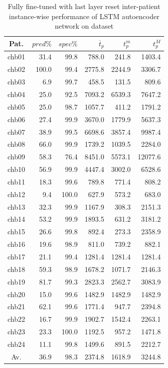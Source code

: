 \begin{table}[ht]
    \centering
    \begin{tabular}{c|rrrrr}
    Pat.  & $pred\%$ & $spec\%$ & $\overline{t}_p$   & $t_p^m$  & $t_p^M$   \\ \hline
    chb01   & 31.4   & 99.8   & 788.0   & 241.8   & 1403.4  \\
    chb02   & 100.0  & 99.4   & 2775.8  & 2244.9  & 3306.7  \\
    chb03   & 6.9    & 99.7   & 458.5   & 131.5   & 809.6   \\
    chb04   & 25.0   & 92.5   & 7093.2  & 6539.3  & 7647.2  \\
    chb05   & 25.0   & 98.7   & 1057.7  & 411.2   & 1791.2  \\
    chb06   & 27.4   & 99.9   & 3670.0  & 1779.9  & 5637.3  \\
    chb07   & 38.9   & 99.5   & 6698.6  & 3857.4  & 9987.4  \\
    chb08   & 66.0   & 99.9   & 1739.2  & 1039.5  & 2284.0  \\
    chb09   & 58.3   & 76.4   & 8451.0  & 5573.1  & 12077.6 \\
    chb10   & 56.9   & 99.9   & 4447.4  & 3002.0  & 6528.6  \\
    chb11   & 18.3   & 99.6   & 789.8   & 771.4   & 808.2   \\
    chb12   & 9.4    & 100.0  & 627.9   & 573.2   & 683.0   \\
    chb13   & 32.3   & 99.9   & 1167.9  & 308.3   & 2151.3  \\
    chb14   & 53.2   & 99.9   & 1893.5  & 631.2   & 3181.2  \\
    chb15   & 26.6   & 99.8   & 892.4   & 273.3   & 2358.9  \\
    chb16   & 19.6   & 98.9   & 811.0   & 739.2   & 882.1   \\
    chb17   & 21.1   & 99.4   & 1281.4  & 1281.4  & 1281.4  \\
    chb18   & 59.3   & 98.9   & 1678.2  & 1071.7  & 2146.3  \\
    chb19   & 81.7   & 99.3   & 2823.3  & 2562.7  & 3083.9  \\
    chb20   & 15.0   & 99.6   & 1482.9  & 1482.9  & 1482.9  \\
    chb21   & 62.1   & 99.6   & 1771.4  & 947.7   & 2394.8  \\
    chb22   & 16.7   & 99.9   & 1902.7  & 1542.4  & 2263.1  \\
    chb23   & 23.3   & 100.0  & 1192.5  & 957.2   & 1471.8  \\
    chb24   & 11.1   & 99.8   & 1499.6  & 891.5   & 2212.7  \\ \hline
    Av.     & 36.9   & 98.3   & 2374.8  & 1618.9  & 3244.8  \\ \hline
    \end{tabular}
    \caption{Fully fine-tuned with last layer reset inter-patient instance-wise performance of LSTM autoencoder network on  dataset}
    \label{tab:reset-inter-patient-lstm-instance} 
\end{table}

